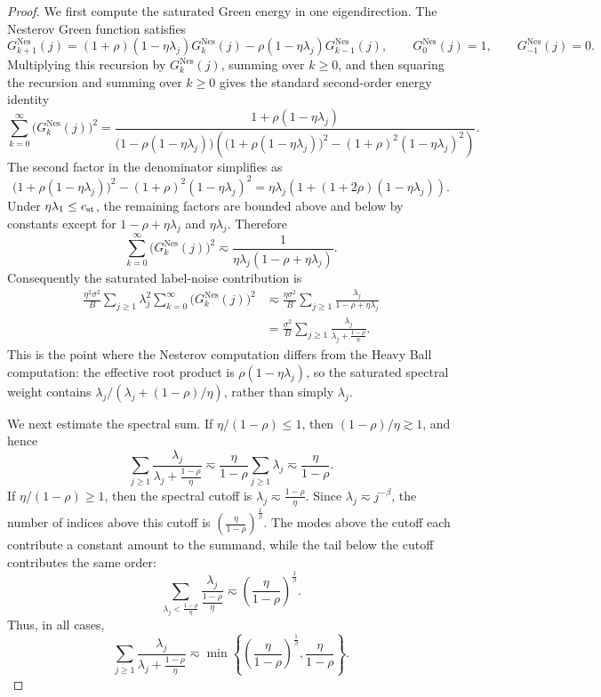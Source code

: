 \begin{proof}
We first compute the saturated Green energy in one eigendirection.  The Nesterov Green function satisfies
\[
    G_{k+1}^{\mathrm{Nes}}(j)
    =
    (1+\rho)(1-\eta\lambda_j)G_k^{\mathrm{Nes}}(j)
    -\rho(1-\eta\lambda_j)G_{k-1}^{\mathrm{Nes}}(j),
    \qquad
    G_0^{\mathrm{Nes}}(j)=1,
    \qquad
    G_{-1}^{\mathrm{Nes}}(j)=0.
\]
Multiplying this recursion by \(G_k^{\mathrm{Nes}}(j)\), summing over \(k\ge0\), and then squaring the
recursion and summing over \(k\ge0\) gives the standard second-order energy identity
\[
    \sum_{k=0}^{\infty}\bigl(G_k^{\mathrm{Nes}}(j)\bigr)^2
    =
    \frac{1+\rho(1-\eta\lambda_j)}
    {\bigl(1-\rho(1-\eta\lambda_j)\bigr)
    \left(\bigl(1+\rho(1-\eta\lambda_j)\bigr)^2
    -(1+\rho)^2(1-\eta\lambda_j)^2\right)}.
\]
The second factor in the denominator simplifies as
\[
    \bigl(1+\rho(1-\eta\lambda_j)\bigr)^2
    -(1+\rho)^2(1-\eta\lambda_j)^2
    =
    \eta\lambda_j\left(1+(1+2\rho)(1-\eta\lambda_j)\right).
\]
Under \(\eta\lambda_1\le c_{\rm st}\), the remaining factors are bounded above and below by constants
except for \(1-\rho+\eta\lambda_j\) and \(\eta\lambda_j\).  Therefore
\[
    \sum_{k=0}^{\infty}\bigl(G_k^{\mathrm{Nes}}(j)\bigr)^2
    \eqsim
    \frac{1}{\eta\lambda_j(1-\rho+\eta\lambda_j)}.
\]
Consequently the saturated label-noise contribution is
\[
\begin{aligned}
    \frac{\eta^2\sigma^2}{B}
    \sum_{j\ge1}\lambda_j^2
    \sum_{k=0}^{\infty}\bigl(G_k^{\mathrm{Nes}}(j)\bigr)^2
    &\eqsim
    \frac{\eta\sigma^2}{B}
    \sum_{j\ge1}\frac{\lambda_j}{1-\rho+\eta\lambda_j}  \\
    &=
    \frac{\sigma^2}{B}
    \sum_{j\ge1}
    \frac{\lambda_j}{\lambda_j+\frac{1-\rho}{\eta}} .
\end{aligned}
\]
This is the point where the Nesterov computation differs from the Heavy Ball computation: the effective
root product is \(\rho(1-\eta\lambda_j)\), so the saturated spectral weight contains
\(\lambda_j/(\lambda_j+(1-\rho)/\eta)\), rather than simply \(\lambda_j\).

We next estimate the spectral sum.  If \(\eta/(1-\rho)\le1\), then \((1-\rho)/\eta\gtrsim1\), and hence
\[
    \sum_{j\ge1}
    \frac{\lambda_j}{\lambda_j+\frac{1-\rho}{\eta}}
    \eqsim
    \frac{\eta}{1-\rho}\sum_{j\ge1}\lambda_j
    \eqsim
    \frac{\eta}{1-\rho}.
\]
If \(\eta/(1-\rho)\ge1\), then the spectral cutoff is
$\lambda_j\eqsim\frac{1-\rho}{\eta}.$
Since \(\lambda_j\eqsim j^{-\beta}\), the number of indices above this cutoff is
$\left(\frac{\eta}{1-\rho}\right)^{\frac1\beta}.$
The modes above the cutoff each contribute a constant amount to the summand, while the tail below the
cutoff contributes the same order:
\[
    \sum_{\lambda_j<\frac{1-\rho}{\eta}}
    \frac{\lambda_j}{\frac{1-\rho}{\eta}}
    \eqsim
    \left(\frac{\eta}{1-\rho}\right)^{\frac1\beta}.
\]
Thus, in all cases,
\[
    \sum_{j\ge1}
    \frac{\lambda_j}{\lambda_j+\frac{1-\rho}{\eta}}
    \eqsim
    \min\left\{
        \left(\frac{\eta}{1-\rho}\right)^{\frac1\beta},
        \frac{\eta}{1-\rho}
    \right\}.
\]


\end{proof}
